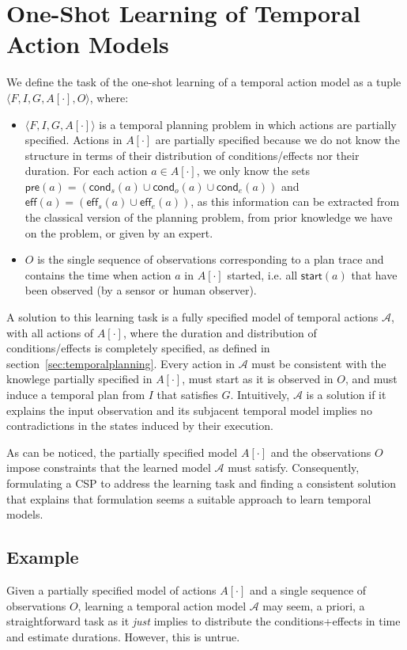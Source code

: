 \documentclass[runningheads]{llncs}
\newcommand{\tup}[1]{{\langle #1 \rangle}}
\newcommand{\pre}{\mathsf{pre}}    %
\newcommand{\eff}{\mathsf{eff}}    %
\newcommand{\cond}{\mathsf{cond}}  %
\newcommand{\start}{\mathsf{start}}%
\begin{document}
\section{One-Shot Learning of Temporal Action Models}
  \label{sec:learningtask}
  We define the task of the one-shot learning of a temporal action model as a tuple $\tup{F,I,G,A[\cdot],O}$, where:
  \begin{itemize}
  \item $\tup{F,I,G,A[\cdot]}$ is a temporal planning problem in which actions are partially specified.  Actions in $A[\cdot]$ are partially specified because we do not know the structure in terms of their distribution of conditions/effects nor their duration. For each action $a \in A[\cdot]$, we only know the sets $\pre(a)=(\cond_s(a) \cup \cond_o(a) \cup \cond_e(a))$ and $\eff(a)=(\eff_s(a) \cup \eff_e(a))$, as this information can be extracted from the classical version of the planning problem, from prior knowledge we have on the problem, or given by an expert. 
  \item $O$ is the single sequence of observations corresponding to a plan trace and contains the time when action $a$ in $A[\cdot]$ started, i.e. all $\start(a)$ that have been observed (by a sensor or human observer).    
  \end{itemize}    

  A solution to this learning task is a fully specified model of temporal actions $\mathcal{A}$, with all actions of $A[\cdot]$, where the duration and distribution of conditions/effects is completely specified, as defined in section~\ref{sec:temporalplanning}. Every action in $\mathcal{A}$ must be consistent with the knowlege partially specified in $A[\cdot]$, must start as it is observed in $O$, and must induce a temporal plan from $I$ that satisfies $G$. Intuitively, $\mathcal{A}$ is a solution if it explains the input observation and its subjacent temporal model implies no contradictions in the states induced by their execution.


As can be noticed, the partially specified model $A[\cdot]$ and the observations $O$ impose constraints that the learned model $\mathcal{A}$ must satisfy. Consequently, formulating a CSP to address the learning task and finding a consistent solution that explains that formulation seems a suitable approach to learn temporal models.  
  
  
\subsection{Example}
  \label{sec:simpleTask}
Given a partially specified model of actions $A[\cdot]$ and a single sequence of observations $O$, learning a temporal action model $\mathcal{A}$  may seem, a priori, a straightforward task as it \emph{just} implies to distribute the conditions+effects in time and estimate durations. However, this is untrue.
\end{document}
